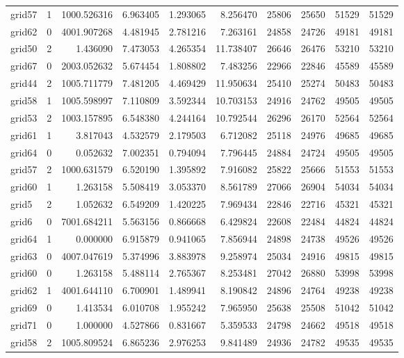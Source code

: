 \begin{longtable}{|l|r|r|r|r|r|r|r|r|r|}
grid57 & 1 & 1000.526316 & 6.963405 & 1.293065 & 8.256470 & 25806 & 25650 & 51529 & 51529 \\
grid62 & 0 & 4001.907268 & 4.481945 & 2.781216 & 7.263161 & 24858 & 24726 & 49181 & 49181 \\
grid50 & 2 & 1.436090 & 7.473053 & 4.265354 & 11.738407 & 26646 & 26476 & 53210 & 53210 \\
grid67 & 0 & 2003.052632 & 5.674454 & 1.808802 & 7.483256 & 22966 & 22846 & 45589 & 45589 \\
grid44 & 2 & 1005.711779 & 7.481205 & 4.469429 & 11.950634 & 25410 & 25274 & 50483 & 50483 \\
grid58 & 1 & 1005.598997 & 7.110809 & 3.592344 & 10.703153 & 24916 & 24762 & 49505 & 49505 \\
grid53 & 2 & 1003.157895 & 6.548380 & 4.244164 & 10.792544 & 26296 & 26170 & 52564 & 52564 \\
grid61 & 1 & 3.817043 & 4.532579 & 2.179503 & 6.712082 & 25118 & 24976 & 49685 & 49685 \\
grid64 & 0 & 0.052632 & 7.002351 & 0.794094 & 7.796445 & 24884 & 24724 & 49505 & 49505 \\
grid57 & 2 & 1000.631579 & 6.520190 & 1.395892 & 7.916082 & 25822 & 25666 & 51553 & 51553 \\
grid60 & 1 & 1.263158 & 5.508419 & 3.053370 & 8.561789 & 27066 & 26904 & 54034 & 54034 \\
grid5 & 2 & 1.052632 & 6.549209 & 1.420225 & 7.969434 & 22846 & 22716 & 45321 & 45321 \\
grid6 & 0 & 7001.684211 & 5.563156 & 0.866668 & 6.429824 & 22608 & 22484 & 44824 & 44824 \\
grid64 & 1 & 0.000000 & 6.915879 & 0.941065 & 7.856944 & 24898 & 24738 & 49526 & 49526 \\
grid63 & 0 & 4007.047619 & 5.374996 & 3.883978 & 9.258974 & 25034 & 24916 & 49815 & 49815 \\
grid60 & 0 & 1.263158 & 5.488114 & 2.765367 & 8.253481 & 27042 & 26880 & 53998 & 53998 \\
grid62 & 1 & 4001.644110 & 6.700901 & 1.489941 & 8.190842 & 24896 & 24764 & 49238 & 49238 \\
grid69 & 0 & 1.413534 & 6.010708 & 1.955242 & 7.965950 & 25638 & 25508 & 51042 & 51042 \\
grid71 & 0 & 1.000000 & 4.527866 & 0.831667 & 5.359533 & 24798 & 24662 & 49518 & 49518 \\
grid58 & 2 & 1005.809524 & 6.865236 & 2.976253 & 9.841489 & 24936 & 24782 & 49535 & 49535 \\

\end{longtable}
